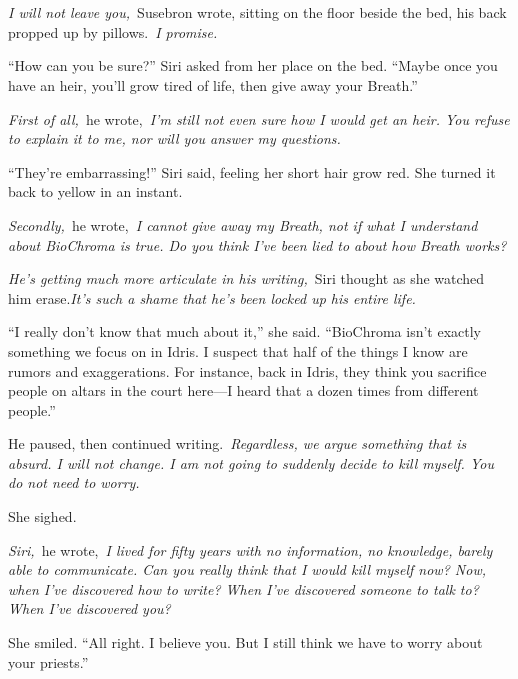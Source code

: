 \chapter{}

\textit{I will not leave you,}~Susebron wrote, sitting on the floor beside the bed, his back propped up by pillows.~\textit{I promise.}

“How can you be sure?” Siri asked from her place on the bed. “Maybe once you have an heir, you’ll grow tired of life, then give away your Breath.”

\textit{First of all,}~he wrote,~\textit{I’m still not even sure how I would get an heir. You refuse to explain it to me, nor will you answer my questions.}

“They’re embarrassing!” Siri said, feeling her short hair grow red. She turned it back to yellow in an instant.

\textit{Secondly,}~he wrote,~\textit{I cannot give away my Breath, not if what I understand about BioChroma is true. Do you think I’ve been lied to about how Breath works?}

\textit{He’s getting much more articulate in his writing,}~Siri thought as she watched him erase.\textit{It’s such a shame that he’s been locked up his entire life.}

“I really don’t know that much about it,” she said. “BioChroma isn’t exactly something we focus on in Idris. I suspect that half of the things I know are rumors and exaggerations. For instance, back in Idris, they think you sacrifice people on altars in the court here—I heard that a dozen times from different people.”

He paused, then continued writing.~\textit{Regardless, we argue something that is absurd. I will not change. I am not going to suddenly decide to kill myself. You do not need to worry.}

She sighed.

\textit{Siri,}~he wrote,~\textit{I lived for fifty years with no information, no knowledge, barely able to communicate. Can you really think that I would kill myself now? Now, when I’ve discovered how to write? When I’ve discovered someone to talk to? When I’ve discovered you?}

She smiled. “All right. I believe you. But I still think we have to worry about your priests.”

